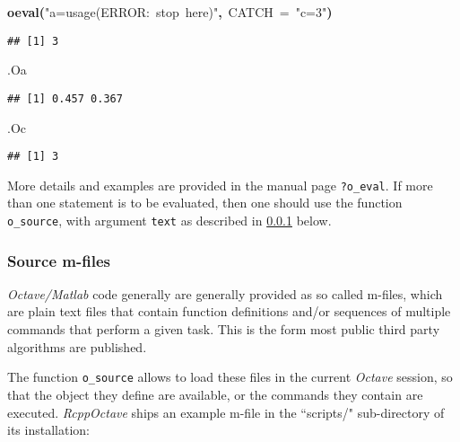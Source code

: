 \documentclass[english,10pt,a4paper]{article}\usepackage{graphicx, color}
\makeatletter
\newcommand{\hlfunctioncall}[1]{\textcolor[rgb]{0.501960784313725,0,0.329411764705882}{\textbf{#1}}}%
\newcommand{\hlstring}[1]{\textcolor[rgb]{0.6,0.6,1}{#1}}%
\newcommand{\hlkeyword}[1]{\textcolor[rgb]{0,0,0}{\textbf{#1}}}%
\newcommand{\hlargument}[1]{\textcolor[rgb]{0.690196078431373,0.250980392156863,0.0196078431372549}{#1}}%
\newcommand{\hlsymbol}[1]{\textcolor[rgb]{0,0,0}{#1}}%
\newcommand{\hlstd}[1]{\textcolor[rgb]{0,0,0}{#1}}%
\newenvironment{kframe}{%
 \def\FrameCommand##1{\hskip\@totalleftmargin \hskip-\fboxsep
 \colorbox{shadecolor}{##1}\hskip-\fboxsep
     \hskip-\linewidth \hskip-\@totalleftmargin \hskip\columnwidth}%
 \MakeFramed {\advance\hsize-\width
   \@totalleftmargin\z@ \linewidth\hsize
   \@setminipage}}%
 {\par\unskip\endMakeFramed}
\newenvironment{knitrout}{}{} %
\let\proglang=\textit
\let\code=\texttt
\newcommand{\pkgname}[1]{\textit{#1}\xspace}
\newcommand{\octave}{\proglang{Octave}\xspace}
\makeatother
\begin{document}
\begin{knitrout}
\begin{kframe}
\begin{flushleft}
\hlstd{}\hlfunctioncall{o\usebox{\hlnormalsizeboxunderscore}eval}\hlkeyword{(}\hlstring{"{}a=usage(\usebox{\hlnormalsizeboxsinglequote}ERROR:{\ }stop{\ }here\usebox{\hlnormalsizeboxsinglequote})"{}}\hlkeyword{,}{\ }\hlargument{CATCH}{\ }\hlargument{=}{\ }\hlstring{"{}c=3"{}}\hlkeyword{)}\mbox{}
\normalfont
\end{flushleft}
\begin{verbatim}
## [1] 3
\end{verbatim}
\begin{flushleft}
\ttfamily\noindent
\hlsymbol{.O}\hlkeyword{\usebox{\hlnormalsizeboxdollar}}\hlsymbol{a}\mbox{}
\normalfont
\end{flushleft}
\begin{verbatim}
## [1] 0.457 0.367
\end{verbatim}
\begin{flushleft}
\ttfamily\noindent
\hlsymbol{.O}\hlkeyword{\usebox{\hlnormalsizeboxdollar}}\hlsymbol{c}\mbox{}
\normalfont
\end{flushleft}
\begin{verbatim}
## [1] 3
\end{verbatim}
\end{kframe}
\end{knitrout}


More details and examples are provided in the manual page \code{?o\_eval}.
If more than one statement is to be evaluated, then one should use the function
\code{o\_source}, with argument \code{text} as described in \cref{sec:o_source} below.

\subsubsection{Source m-files}
\label{sec:o_source}

\proglang{Octave/Matlab} code generally are generally provided as so
called m-files, which are plain text files that contain function definitions
and/or sequences of multiple commands that perform a given task.
This is the form most public third party algorithms are published.

The function \code{o\_source} allows to load these files in the current
\octave session, so that the object they define are available, or the
commands they contain are executed.
\pkgname{RcppOctave} ships an example m-file in the ``scripts/" sub-directory
of its installation:
\end{document}
